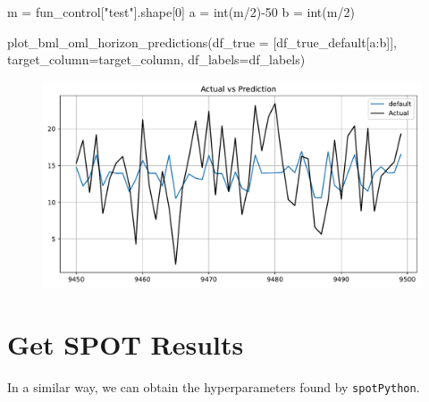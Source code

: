 \documentclass[
  letterpaper,
  DIV=11,
  numbers=noendperiod]{scrreprt}
\newenvironment{Shaded}{\begin{snugshade}}{\end{snugshade}}
\newcommand{\BuiltInTok}[1]{\textcolor[rgb]{0.00,0.23,0.31}{#1}}
\newcommand{\DecValTok}[1]{\textcolor[rgb]{0.68,0.00,0.00}{#1}}
\newcommand{\NormalTok}[1]{\textcolor[rgb]{0.00,0.23,0.31}{#1}}
\newcommand{\OperatorTok}[1]{\textcolor[rgb]{0.37,0.37,0.37}{#1}}
\newcommand{\StringTok}[1]{\textcolor[rgb]{0.13,0.47,0.30}{#1}}
\begin{document}
\begin{Shaded}
\begin{Highlighting}[]
\NormalTok{m }\OperatorTok{=}\NormalTok{ fun\_control[}\StringTok{"test"}\NormalTok{].shape[}\DecValTok{0}\NormalTok{]}
\NormalTok{a }\OperatorTok{=} \BuiltInTok{int}\NormalTok{(m}\OperatorTok{/}\DecValTok{2}\NormalTok{)}\OperatorTok{{-}}\DecValTok{50}
\NormalTok{b }\OperatorTok{=} \BuiltInTok{int}\NormalTok{(m}\OperatorTok{/}\DecValTok{2}\NormalTok{)}
\end{Highlighting}
\end{Shaded}

\begin{Shaded}
\begin{Highlighting}[]
\NormalTok{plot\_bml\_oml\_horizon\_predictions(df\_true }\OperatorTok{=}\NormalTok{ [df\_true\_default[a:b]], target\_column}\OperatorTok{=}\NormalTok{target\_column,  df\_labels}\OperatorTok{=}\NormalTok{df\_labels)}
\end{Highlighting}
\end{Shaded}

\begin{figure}[H]

{\centering \includegraphics{024_spot_hpt_river_friedman_hatr_files/figure-pdf/cell-31-output-1.pdf}

}

\end{figure}

\hypertarget{get-spot-results-5}{%
\section{Get SPOT Results}\label{get-spot-results-5}}

In a similar way, we can obtain the hyperparameters found by
\texttt{spotPython}.
\end{document}
